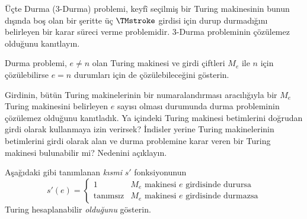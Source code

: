 \begin{prob}
Üçte Durma (3-Durma) problemi, keyfî seçilmiş bir Turing makinesinin bunun
dışında boş olan bir şeritte üç $\TMstroke$ girdisi için durup durmadığını
belirleyen bir karar süreci verme problemidir. 3-Durma probleminin çözülemez
olduğunu kanıtlayın.
\end{prob}

\begin{prob}
Durma problemi, $e\neq n$ olan Turing makinesi ve girdi çiftleri $M_e$ ile
$n$ için çözülebilirse $e=n$ durumları için de çözülebileceğini gösterin.
\end{prob}

\begin{prob}
Girdinin, bütün Turing makinelerinin bir numaralandırması aracılığıyla bir
$M_e$ Turing makinesini belirleyen $e$ sayısı olması durumunda durma
probleminin çözülemez olduğunu kanıtladık. Ya
 içindeki Turing makinesi betimlerini doğrudan
girdi olarak kullanmaya izin verirsek? İndisler yerine Turing makinelerinin
betimlerini girdi olarak alan ve durma problemine karar veren bir Turing
makinesi bulunabilir mi? Nedenini açıklayın.
\end{prob}

\begin{prob} Aşağıdaki gibi tanımlanan \emph{kısmi} $s'$ fonksiyonunun
  \[
  s'(e) =
  \begin{cases}
    \text{1} & \text{$M_e$ makinesi $e$ girdisinde durursa}\\
    \text{tanımsız} & \text{$M_e$ makinesi $e$ girdisinde durmazsa}
  \end{cases}
  \]
  Turing hesaplanabilir \emph{olduğunu} gösterin.
\end{prob}


